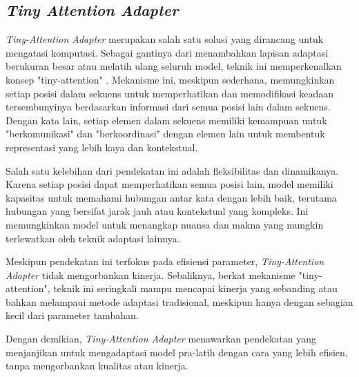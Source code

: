 \subsection{\textit{Tiny Attention Adapter}}

\textit{Tiny-Attention Adapter} merupakan salah satu solusi yang dirancang untuk mengatasi komputasi. Sebagai gantinya dari menambahkan lapisan adaptasi berukuran besar atau melatih ulang seluruh model, teknik ini memperkenalkan konsep "tiny-attention" \parencite{tinyattention}. Mekanisme ini, meskipun sederhana, memungkinkan setiap posisi dalam sekuens untuk memperhatikan dan memodifikasi keadaan tersembunyinya berdasarkan informasi dari semua posisi lain dalam sekuens. Dengan kata lain, setiap elemen dalam sekuens memiliki kemampuan untuk "berkomunikasi" dan "berkoordinasi" dengan elemen lain untuk membentuk representasi yang lebih kaya dan kontekstual.

Salah satu kelebihan dari pendekatan ini adalah fleksibilitas dan dinamikanya. Karena setiap posisi dapat memperhatikan semua posisi lain, model memiliki kapasitas untuk memahami hubungan antar kata dengan lebih baik, terutama hubungan yang bersifat jarak jauh atau kontekstual yang kompleks. Ini memungkinkan model untuk menangkap nuansa dan makna yang mungkin terlewatkan oleh teknik adaptasi lainnya.

Meskipun pendekatan ini terfokus pada efisiensi parameter, \textit{Tiny-Attention Adapter} tidak mengorbankan kinerja. Sebaliknya, berkat mekanisme "tiny-attention", teknik ini seringkali mampu mencapai kinerja yang sebanding atau bahkan melampaui metode adaptasi tradisional, meskipun hanya dengan sebagian kecil dari parameter tambahan.

Dengan demikian, \textit{Tiny-Attention Adapter} menawarkan pendekatan yang menjanjikan untuk mengadaptasi model pra-latih dengan cara yang lebih efisien, tanpa mengorbankan kualitas atau kinerja.